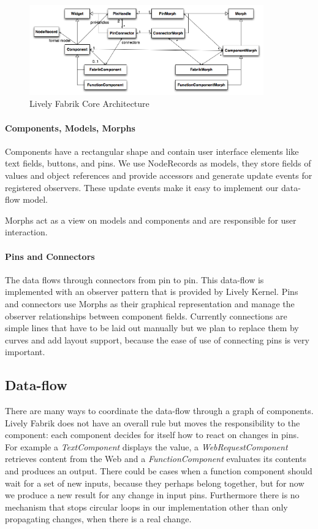 \documentclass[pdftex, times, 10pt, twocolumn]{article}
\begin{document}
\begin{figure}[]\centering
\includegraphics[width=0.900000\textwidth]{LivelyFabrikCore.png} 

\caption{Lively Fabrik Core Architecture }
\label{fig:LivelyFabrikCore}
\end{figure}


\paragraph{Components, Models, Morphs}
Components have a rectangular shape and contain user interface elements like text fields, buttons, and pins.  We use NodeRecords as models, they store fields of values and object references and provide accessors and generate update events for registered observers. These update events make it easy to implement our data-flow model.  

Morphs act as a view on models and components and are responsible for user interaction.  



\paragraph{Pins and Connectors}
The data flows through connectors from pin to pin. This data-flow is implemented with an observer pattern that is provided by Lively Kernel. Pins and connectors use Morphs as their graphical representation and manage the observer relationships between component fields. Currently connections are simple lines that have to be laid out manually but we plan to replace them by curves and add layout support, because the ease of use of connecting pins is very important. 



\subsection{Data-flow}
There are many ways to coordinate the data-flow through a graph of components. Lively Fabrik does not have an overall rule but moves the responsibility to the component: each component decides for itself how to react on changes in pins. For example a {\em TextComponent} displays the value, a {\em WebRequestComponent} retrieves content from the Web and a {\em FunctionComponent} evaluates its contents and produces an output. There could be cases when a function component should wait for a set of new inputs, because they perhaps belong together, but for now we produce a new result for any change in input pins. Furthermore there is no mechanism that stops circular loops in our implementation other than only propagating changes, when there is a real change.  
\end{document}
